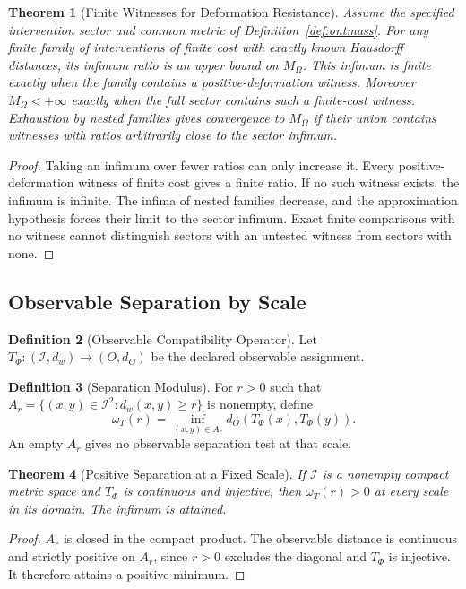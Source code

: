 \documentclass[11pt,a4paper]{article}
\theoremstyle{plain}
\newtheorem{theorem}{Theorem}[section]
\theoremstyle{definition}
\newtheorem{definition}[theorem]{Definition}
\theoremstyle{remark}
\begin{document}
\begin{theorem}[Finite Witnesses for Deformation Resistance]\label{thm:detectability}
Assume the specified intervention sector and common metric of Definition~\ref{def:ontmass}. For any finite family of interventions of finite cost with exactly known Hausdorff distances, its infimum ratio is an upper bound on $M_\Omega$. This infimum is finite exactly when the family contains a positive-deformation witness. Moreover $M_\Omega<+\infty$ exactly when the full sector contains such a finite-cost witness. Exhaustion by nested families gives convergence to $M_\Omega$ if their union contains witnesses with ratios arbitrarily close to the sector infimum.
\end{theorem}
\begin{proof}
Taking an infimum over fewer ratios can only increase it. Every positive-deformation witness of finite cost gives a finite ratio. If no such witness exists, the infimum is infinite. The infima of nested families decrease, and the approximation hypothesis forces their limit to the sector infimum. Exact finite comparisons with no witness cannot distinguish sectors with an untested witness from sectors with none.
\end{proof}

\subsection{Observable Separation by Scale}

\begin{definition}[Observable Compatibility Operator]\label{def:phenom-compat}
Let $T_\Phi:(\mathcal I,d_w)\to(O,d_O)$ be the declared observable assignment.
\end{definition}

\begin{definition}[Separation Modulus]\label{def:spectral-constant}
For $r>0$ such that $A_r=\{(x,y)\in\mathcal I^2:d_w(x,y)\ge r\}$ is nonempty, define
\[
 \omega_T(r)=\inf_{(x,y)\in A_r} d_O(T_\Phi(x),T_\Phi(y)).
\]
An empty $A_r$ gives no observable separation test at that scale.
\end{definition}

\begin{theorem}[Positive Separation at a Fixed Scale]\label{thm:spectral-coupling}
If $\mathcal I$ is a nonempty compact metric space and $T_\Phi$ is continuous and injective, then $\omega_T(r)>0$ at every scale in its domain. The infimum is attained.
\end{theorem}
\begin{proof}
$A_r$ is closed in the compact product. The observable distance is continuous and strictly positive on $A_r$, since $r>0$ excludes the diagonal and $T_\Phi$ is injective. It therefore attains a positive minimum.
\end{proof}
\end{document}

